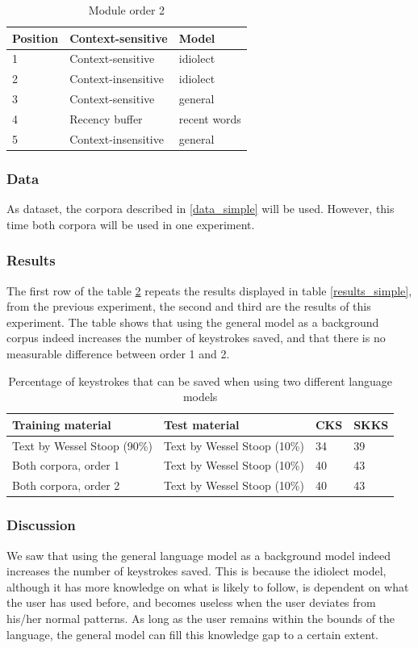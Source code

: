\documentclass[12pt]{article}
\begin{document}
\begin{table}[h]
\begin{tabular}{lll} 
Position&Context-sensitive&Model\\
\hline
1&Context-sensitive&idiolect\\
2&Context-insensitive&idiolect\\
3&Context-sensitive&general\\
4&Recency buffer&recent words\\
5&Context-insensitive&general\\
\end{tabular} 
\caption{Module order 2} \label{order2}
\end{table}

\subsubsection{Data}
As dataset, the corpora described in \ref{data_simple} will be used. However, this time  both corpora will be used in one experiment.

\subsubsection{Results}

The first  row of the table \ref{results_background} repeats the results displayed in table \ref{results_simple}, from the previous experiment, the second and third are the results of this experiment. The table shows that using the general model as a background corpus indeed increases the number of keystrokes saved, and that there is no measurable difference between order 1 and 2.

\begin{table}[h]
\begin{tabular}{ll|ll} 
Training material&Test material&CKS&SKKS\\
\hline
Text by Wessel Stoop (90\%)&Text by Wessel Stoop (10\%)&34&39\\
Both corpora, order 1&Text by Wessel Stoop (10\%)&40&43\\
Both corpora, order 2&Text by Wessel Stoop (10\%)&40&43\\
\end{tabular} 
\caption{Percentage of keystrokes that can be saved when using two different language models} \label{results_background}
\end{table}

\subsubsection{Discussion}
We saw that using the general language model as a background model indeed increases the number of keystrokes saved. This is because the idiolect model, although it has more knowledge on what is likely to follow, is dependent on what the user has used before, and becomes useless when the user deviates from his/her normal patterns. As long as the user remains within the bounds of the language, the general model can fill this knowledge gap to a certain extent.
\end{document}
